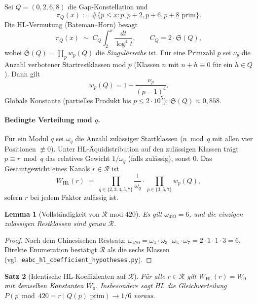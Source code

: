 \documentclass[11pt,a4paper]{article}
\newtheorem{theorem}{Satz}
\newtheorem{lemma}[theorem]{Lemma}
\newcommand{\R}{\mathcal{R}}
\newcommand{\HL}{\mathrm{HL}}
\begin{document}
Sei $Q=(0,2,6,8)$ die Gap-Konstellation und
\[
  \pi_Q(x) := \#\{p\le x : p,p+2,p+6,p+8\text{ prim}\}.
\]
Die HL-Vermutung (Bateman--Horn) besagt
\begin{equation}
  \pi_Q(x) \;\sim\; C_Q \int_2^x \frac{dt}{\log^4 t},
  \qquad
  C_Q = 2\cdot \mathfrak{S}(Q),
\end{equation}
wobei $\mathfrak{S}(Q)=\prod_p w_p(Q)$ die \emph{Singulärreihe} ist.
Für eine Primzahl $p$ sei $\nu_p$ die Anzahl verbotener Startrestklassen
mod $p$ (Klassen $n$ mit $n+h\equiv 0$ für ein $h\in Q$).
Dann gilt
\begin{equation}
  w_p(Q) = 1 - \frac{\nu_p}{(p-1)^4}.
  \label{eq:wp}
\end{equation}
Globale Konstante (partielles Produkt bis $p\le 2\cdot 10^5$):
$\mathfrak{S}(Q)\approx 0{,}858$.

\paragraph{Bedingte Verteilung mod $q$.}
Für ein Modul $q$ sei $\omega_q$ die Anzahl zulässiger Startklassen
($n\bmod q$ mit allen vier Positionen $\not\equiv 0$).
Unter HL-Äquidistribution auf den zulässigen Klassen trägt
$p\equiv r\bmod q$ das relatives Gewicht $1/\omega_q$ (falls zulässig),
sonst $0$.
Das Gesamtgewicht eines Kanals $r\in\R$ ist
\begin{equation}
  W_{\HL}(r) \;=\; \prod_{q\in\{2,3,4,5,7\}} \frac{1}{\omega_q}
  \cdot \prod_{p\in\{3,5,7\}} w_p(Q),
  \label{eq:channel-weight}
\end{equation}
sofern $r$ bei jedem Faktor zulässig ist.

\begin{lemma}[Vollständigkeit von $\R$ mod $420$]
\label{lem:R-complete}
Es gilt $\omega_{420}=6$, und die einzigen zulässigen Restklassen sind
genau $\R$.
\end{lemma}

\begin{proof}
Nach dem Chinesischen Restsatz:
$\omega_{420}=\omega_4\cdot\omega_3\cdot\omega_5\cdot\omega_7
= 2\cdot 1\cdot 1\cdot 3 = 6$.
Direkte Enumeration bestätigt $\R$ als die sechs Klassen
(vgl.\ \texttt{eabc\_hl\_coefficient\_hypotheses.py}).
\end{proof}

\begin{theorem}[Identische HL-Koeffizienten auf $\R$]
\label{thm:equal-hl}
Für alle $r\in\R$ gilt $W_{\HL}(r)=W_0$ mit demselben Konstanten $W_0$.
Insbesondere sagt HL die Gleichverteilung
$P(p\bmod 420=r\mid Q(p)\text{ prim})\to 1/6$ voraus.
\end{theorem}
\end{document}
